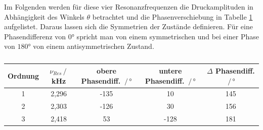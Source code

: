 Im Folgenden werden für diese vier Resonanzfrequenzen die Druckamplituden in Abhängigkeit des Winkels $\theta$ betrachtet und die Phasenverschiebung in Tabelle \ref{tab:mol_diff} aufgelistet.
Daraus lassen sich die Symmetrien der Zustände definieren. Für eine Phasendifferenz von $0°$ spricht man von einem symmetrischen und bei einer Phase von $180°$ von einem antisymmetrischen Zustand.
\begin{figure}[H]
    \centering
    \hfil
    \hfil 
    
    \hfil
    \caption{}
    \label{fig:polarplots}
\end{figure}

\begin{table}
    \center
    \caption{}
    \begin{tabular}{c| c c c c}
        \toprule
        Ordnung & $\nu_{Res}\,/\,$kHz & obere Phasendiff. $\,/\,°$ & untere Phasendiff. $\,/\,°$ & $\Delta$ Phasendiff. $\,/\,°$\\
        \midrule
        1 &2,296 &-135 &10 &145 \\
        2 &2,303 &-126 &30 &156 \\
        3 &2,418 &53 &-128 &181 \\
        \bottomrule
    \end{tabular}
    \label{tab:mol_diff}
\end{table}
\newpage
